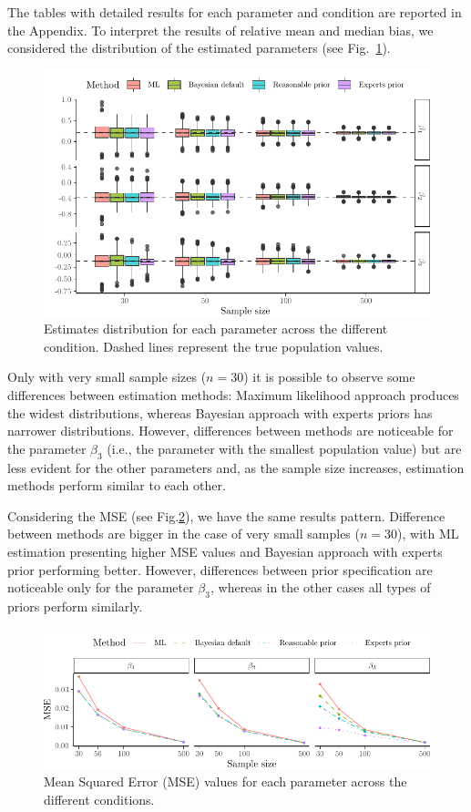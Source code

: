\documentclass[graybox]{svmult}
\begin{document}
The tables with detailed results for each parameter and condition are reported in the Appendix. To interpret the results of relative mean and median bias, we considered the distribution of the estimated parameters (see Fig.~\ref{fig:boxplots}). 
\begin{figure}[b]
	\sidecaption
	\includegraphics[width = .9\textwidth]{figure/Plot_boxplots}
	\caption{Estimates distribution for each parameter across the different condition. Dashed lines represent the true population values.}
	\label{fig:boxplots}
\end{figure}
Only with very small sample sizes ($n=30$) it is possible to observe some differences between estimation methods: Maximum likelihood approach produces the widest distributions, whereas Bayesian approach with experts priors has narrower distributions. However, differences between methods are noticeable for the parameter $\beta_3$ (i.e., the parameter with the smallest population value) but are less evident for the other parameters and, as the sample size increases, estimation methods perform similar to each other.

Considering the MSE (see Fig.\ref{fig:mse}), we have the same results pattern. Difference between methods are bigger in the case of very small samples ($n=30$), with ML estimation presenting higher MSE values and Bayesian approach with experts prior performing better. However, differences between prior specification are noticeable only for the parameter $\beta_3$, whereas in the other cases all types of priors perform similarly.
\begin{figure}[t]
	\sidecaption
	\includegraphics[width = .9\textwidth]{figure/Plot_MSE}
	\caption{Mean Squared Error (MSE) values for each parameter across the different conditions.}
	\label{fig:mse}
\end{figure}
\end{document}
